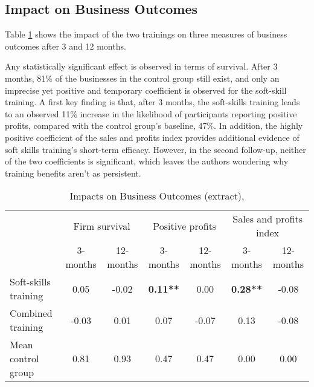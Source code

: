 \vspace{-5px}

\subsection{Impact on Business Outcomes}
\label{sum-sec-business-outcomes}

Table \ref{sum-business-outcomes} shows the impact of the two trainings on three measures of business outcomes after 3 and 12 months.

Any statistically significant effect is observed in terms of survival. After 3 months, 81\% of the businesses in the control group still exist, and only an imprecise yet positive and temporary coefficient is observed for the soft-skill training. A first key finding is that, after 3 months, the soft-skills training leads to an observed 11\% increase in the likelihood of participants reporting positive profits, compared with the control group's baseline, 47\%. In addition, the highly positive coefficient of the sales and profits index provides additional evidence of soft skills training's short-term efficacy. However, in the second follow-up, neither of the two coefficients is significant, which leaves the authors wondering why training benefits aren't as persistent.

\begin{table}
\centering
\caption{Impacts on Business Outcomes (extract), \cite{Ubfal2022}}
\label{sum-business-outcomes}
\begin{adjustbox}{width=\textwidth}
\begin{tabular}{lcccccc} 
\toprule
                     & \multicolumn{2}{c}{Firm survival} & \multicolumn{2}{c}{Positive
  profits} & \multicolumn{2}{c}{Sales and
  profits index}  \\
                     & 3-months & 12-months              & 3-months & 12-months                   & 3-months & 12-months                           \\ 
\hline
Soft-skills training & 0.05     & -0.02                  & \textbf{0.11**}   & 0.00                        & \textbf{0.28**}   & -0.08                               \\
Combined training    & -0.03    & 0.01                   & 0.07     & -0.07                       & 0.13     & -0.08                               \\
Mean control group   & 0.81     & 0.93                   & 0.47     & 0.47                        & 0.00     & 0.00                                \\
\bottomrule
\end{tabular}
\end{adjustbox}
\end{table}


